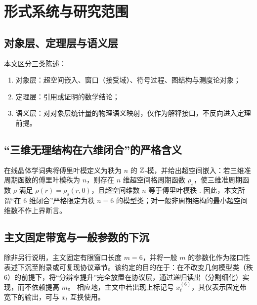 \section{形式系统与研究范围}

\subsection{对象层、定理层与语义层}

本文区分三类陈述：
\begin{enumerate}
  \item 对象层：超空间嵌入、窗口（接受域）、符号过程、图结构与测度论对象；
  \item 定理层：引用或证明的数学结论；
  \item 语义层：对对象层统计量的物理语义映射，仅作为解释接口，不反向进入定理前提。
\end{enumerate}

\subsection{“三维无理结构在六维闭合”的严格含义}

在线晶体学词典将傅里叶模定义为秩为 $n$ 的 $\mathbb{Z}$-模，并给出超空间嵌入：若三维准周期函数的傅里叶模秩为 $n$，则存在 $n$ 维超空间格周期函数 $\rho_s$，使三维准周期函数 $\rho$ 满足 $\rho(r)=\rho_s(r,0)$，且超空间维数 $n$ 等于傅里叶模秩 \cite{IUCRSuperspace}.
因此，本文所谓“在 $6$ 维闭合”严格限定为秩 $n=6$ 的模型类；对一般非周期结构的最小超空间维数不作上界断言。

\subsection{主文固定带宽与一般参数的下沉}
除非另行说明，主文固定有限窗口长度 $m=6$，并将一般 $m$ 的参数化作为接口性表述下沉至附录或可复现协议章节。该约定的目的在于：在不改变几何模型类（秩 $6$）的前提下，将“分辨率提升”完全放置在协议层，通过递归读出（分割细化）实现，而不依赖提高 $m$。
相应地，主文中若出现上标记号 $x_t^{(6)}$，其仅表示固定带宽下的输出，可与 $x_t$ 互换使用。

